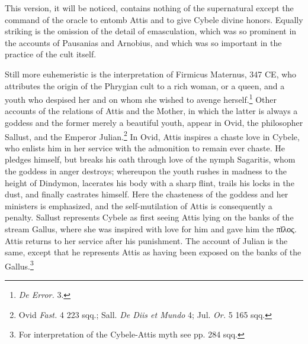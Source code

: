 \documentclass[a4paper, 11pt, oneside, polutonikogreek, english]{article}
\begin{document}
This version, it will be noticed, contains nothing of the supernatural except the command of the oracle to entomb Attis and to give Cybele divine honors. Equally striking is the omission of the detail of emasculation, which was so prominent in the accounts of Pausanias and Arnobius, and which was so important in the practice of the cult itself.

Still more euhemeristic is the interpretation of Firmicus Maternus, 347 \textsc{CE}, who attributes the origin of the Phrygian cult to a rich woman, or a queen, and a youth who despised her and on whom she wished to avenge herself.\footnote{\emph{De Error.} 3.} Other accounts of the relations of Attis and the Mother, in which the latter is always a goddess and the former merely a beautiful youth, appear in Ovid, the philosopher Sallust, and the Emperor Julian.\footnote{Ovid \emph{Fast.} 4 223 sqq.; Sall. \emph{De Diis et Mundo} 4; Jul. \emph{Or.} 5 165 sqq.} In Ovid, Attis inspires a chaste love in Cybele, who enlists him in her service with the admonition to remain ever chaste. He pledges himself, but breaks his oath through love of the nymph Sagaritis, whom the goddess in anger destroys; whereupon the youth rushes in madness to the height of Dindymon, lacerates his body with a sharp flint, trails his locks in the dust, and finally castrates himself. Here the chasteness of the goddess and her ministers is emphasized, and the self-mutilation of Attis is consequently a penalty. Sallust represents Cybele as first seeing Attis lying on the banks of the stream Gallus, where she was inspired with love for him and gave him the πῐλος. Attis returns to her service after his punishment. The account of Julian is the same, except that he represents Attis as having been exposed on the banks of the Gallus.\footnote{For interpretation of the Cybele-Attis myth see pp. 284 sqq.}
\end{document}
